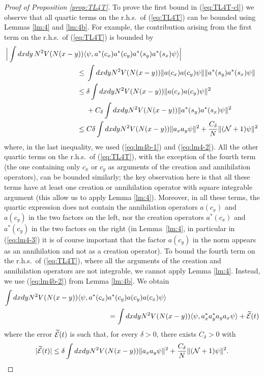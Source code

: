 \documentclass[11pt,a4paper]{article}
\newcommand{\wt}{\widetilde}
\newcommand{\cE}{{\cal E}}
\newcommand{\cN}{{\cal N}}
\begin{document}
\begin{proof}[Proof of Proposition \ref{prop:TL4T}] 
To prove the first bound in (\ref{eq:TL4T-cl}) we observe that all quartic terms on the r.h.s.\ of (\ref{eq:TL4T}) can be bounded using Lemmas \ref{lm:4} and \ref{lm:4b}. For example, the contribution arising from the 
first term on the r.h.s.\ of (\ref{eq:TL4T}) is bounded by
\[ \begin{split} 
\Big| \int dx dy \,  N^2 V (N (x-y)) \langle &\psi ,  a^* (c_x) a^* (c_y) a^* (s_y) a^* (s_x) \psi \rangle \Big| \\\leq \; & \int dx dy N^2 V(N (x-y)) \| a (c_x) a (c_y) \psi \| \| a^* (s_y) a^* (s_x) \psi \| \\
\leq \; & \delta \int dx dy N^2 V (N (x-y)) \| a (c_x) a(c_y) \psi \|^2 \\ &+C_\delta \int dx dy N^2 V(N (x-y)) \| a^* (s_y) a^* (s_x) \psi \|^2 \\
\leq \; & C \delta \int dx dy N^2 V (N (x-y)) \| a_x a_y \psi \|^2 + \frac{C_\delta}{N} \|(\cN+1) \psi \|^2 \end{split} \]
where, in the last inequality, we used (\ref{eq:lm4b-1})  and
(\ref{eq:lm4-2}). All the other quartic terms on the r.h.s.\ of
(\ref{eq:TL4T}), with the exception of the fourth term (the one containing
only $c_x$ or $c_y$ as arguments of the creation and annihilation
operators), can be bounded similarly; the key observation here is that all
these terms have at least one creation or annihilation operator with square
integrable argument (this allow us to apply Lemma \ref{lm:4}). Moreover, in
all these terms, the quartic expression does not contain the annihilation
operators $a(c_x)$ and $a(c_y)$ in the two factors on the left, nor the
creation operators $a^* (c_x)$ and $a^*  (c_y)$ in the two factors on the
right (in Lemma~\ref{lm:4}, in particular in (\ref{eq:lm4-3}) it is of
course important that the factor $a(c_y)$ in the norm appears as an
annihilation and not as a creation operator). To bound the fourth term on the r.h.s.\ of (\ref{eq:TL4T}), where all the arguments of the creation and annihilation operators are not integrable, we cannot apply Lemma \ref{lm:4}. Instead, we use (\ref{eq:lm4b-2}) from Lemma \ref{lm:4b}. We obtain
\[ \begin{split}  \int dx dy N^2 V(N(x-y)) \langle \psi, a^* (c_x) &a^* (c_y) a(c_y) a(c_x) \psi \rangle \\ &=  \int dx dy N^2 V(N (x-y)) \langle \psi , a_x^* a_y^* a_y a_x \psi \rangle + \wt{\cE} (t) \end{split} \]
where the error $\wt{\cE} (t)$ is such that, for every $\delta > 0$, there exists $C_\delta >0$ with
\[ |\wt{\cE} (t)| \leq  \delta \int dx dy N^2 V(N (x-y)) \| a_x a_y \psi \|^2 + \frac{C_\delta}{N} \| (\cN+1) \psi \|^2. \]


\end{proof}
\end{document}
